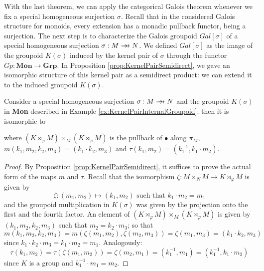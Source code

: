 With the last theorem, we can apply the categorical Galois theorem whenever we fix a special homogeneous surjection $\sigma$. Recall that in the considered Galois structure for monoids, every extension has a monadic pullback functor, being a surjection. The next step is to characterize the Galois groupoid $Gal[\sigma]$ of a special homogeneous surjection $\sigma:M\rrightarrow N$. We defined $Gal[\sigma]$ as the image of the groupoid $K(\sigma)$ induced by the kernel pair of $\sigma$ through the functor $Gp:\textbf{Mon}\longrightarrow \textbf{Grp}$. In Proposition \ref{prop:KernelPairSemidirect}, we gave an isomorphic structure of this kernel pair as a semidirect product: we can extend it to the induced groupoid $K(\sigma)$.

\begin{corollary}
\label{cor:GroupoidKernelPairSemidirect}
    Consider a special homogeneous surjection $\sigma:M\rrightarrow N$ and the groupoid $K(\sigma)$ in \textbf{Mon} described in Example \ref{ex:KernelPairInternalGroupoid}; then it is isomorphic to
    \begin{center}
    \end{center}
    where $(K\rtimes_\varphi M)\times_M(K\rtimes_\varphi M)$ is the pullback of $\bullet$ along $\pi_M$, $m(k_1,m_2,k_2,m_3) = (k_1\cdot k_2, m_3)$ and $\tau(k_1,m_2) = (k^{-1}_1, k_1\cdot m_2)$.
    \begin{proof}
        By Proposition \ref{prop:KernelPairSemidirect}, it suffices to prove the actual form of the maps $m$ and $\tau$. Recall that the isomorphism $\zeta:M\times_NM\longrightarrow K\rtimes_{\varphi}M$ is given by
        \[ \zeta:(m_1,m_2)\longmapsto (k_1, m_2) \text{ such that }k_1\cdot m_2 = m_1 \]
        and the groupoid multiplication in $K(\sigma)$ was given by the projection onto the first and the fourth factor. An element of $(K\rtimes_\varphi M)\times_M(K\rtimes_\varphi M)$ is given by $(k_1,m_2,k_2,m_3)$ such that $m_2=k_2\cdot m_3$; so that
        \[ m(k_1,m_2,k_2,m_3) = m(\zeta(m_1,m_2),\zeta(m_2,m_3)) = \zeta(m_1,m_3) = (k_1\cdot k_2,m_3) \]
        since $k_1\cdot k_2\cdot m_3 = k_1\cdot m_2 = m_1$. Analogously:
        \[ \tau(k_1,m_2) = \tau(\zeta(m_1,m_2)) = \zeta(m_2,m_1) = (k_1^{-1}, m_1) = (k_1^{-1},k_1\cdot m_2) \]
        since $K$ is a group and $k^{-1}_1\cdot m_1 = m_2$.
        
    \end{proof}
\end{corollary}

